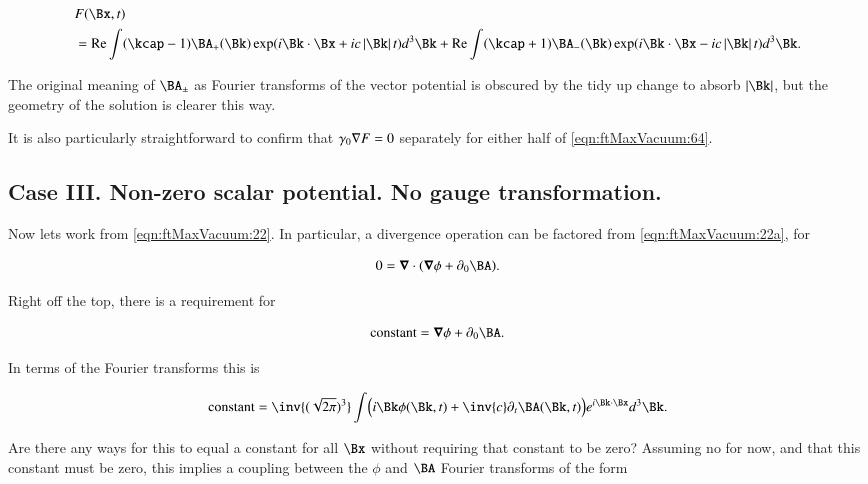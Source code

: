 \begin{equation}\label{eqn:ftMaxVacuum:64}
\begin{aligned}
&F(\Bx, t) \\
&= 
\Real \int ( \kcap - 1 ) \BA_{+}(\Bk) \exp(i \Bk \cdot \Bx + i c \Abs{\Bk} t) d^3 \Bk
+ \Real \int ( \kcap + 1 ) \BA_{-}(\Bk) \exp(i \Bk \cdot \Bx - i c \Abs{\Bk} t) d^3 \Bk.
\end{aligned}
\end{equation}

The original meaning of $\BA_{\pm}$ as Fourier transforms of the vector potential is obscured by the tidy up change to absorb $\Abs{\Bk}$, but the geometry of the solution is clearer this way.

It is also particularly straightforward to confirm that $\gamma_0 \nabla F = 0$ separately for either half of \autoref{eqn:ftMaxVacuum:64}.

\subsection{Case III.  Non-zero scalar potential.  No gauge transformation.}

Now lets work from \autoref{eqn:ftMaxVacuum:22}.  In particular, a divergence operation can be factored from \autoref{eqn:ftMaxVacuum:22a}, for

\begin{align}\label{eqn:ftMaxVacuum:70}
0 = \spacegrad \cdot (\spacegrad \phi + \partial_0 \BA).
\end{align}

Right off the top, there is a requirement for 

\begin{align}\label{eqn:ftMaxVacuum:71}
\text{constant} = \spacegrad \phi + \partial_0 \BA.
\end{align}

In terms of the Fourier transforms this is

\begin{align}\label{eqn:ftMaxVacuum:72}
\text{constant} = 
\inv{(\sqrt{2 \pi})^3} \int 
\Bigl(
i \Bk \phi(\Bk, t) + \inv{c} \partial_t \BA(\Bk, t)
\Bigr)
e^{i \Bk \cdot \Bx } d^3 \Bk.
\end{align}

Are there any ways for this to equal a constant for all $\Bx$ without requiring that constant to be zero?  Assuming no for now, and that this constant must be zero, this implies a coupling between the $\phi$ and $\BA$ Fourier transforms of the form

